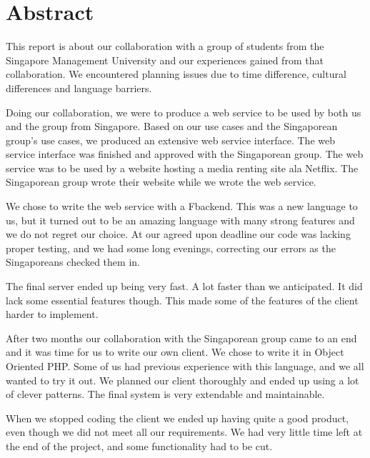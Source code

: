 \section*{Abstract}
This report is about our collaboration with a group of students from the Singapore Management University and our experiences gained from that collaboration. We encountered planning issues due to time difference, cultural differences and language barriers.

Doing our collaboration, we were to produce a web service to be used by both us and the group from Singapore. Based on our use cases and the Singaporean group's use cases, we produced an extensive web service interface. The web service interface was finished and approved with the Singaporean group.
The web service was to be used by a website hosting a media renting site ala Netflix. The Singaporean group wrote their website while we wrote the web service.

We chose to write the web service with a F\Sh backend. This was a new language to us, but it turned out to be an amazing language with many strong features and we do not regret our choice.
At our agreed upon deadline our code was lacking proper testing, and we had some long evenings, correcting our errors as the Singaporeans checked them in.

The final server ended up being very fast. A lot faster than we anticipated. It did lack some essential features though. This made some of the features of the client harder to implement.

After two months our collaboration with the Singaporean group came to an end and it was time for us to write our own client. We chose to write it in Object Oriented PHP. Some of us had previous experience with this language, and we all wanted to try it out. We planned our client thoroughly and ended up using a lot of clever patterns. The final system is very extendable and maintainable.

When we stopped coding the client we ended up having quite a good product, even though we did not meet all our requirements. We had very little time left at the end of the project, and some functionality had to be cut.
\newpage